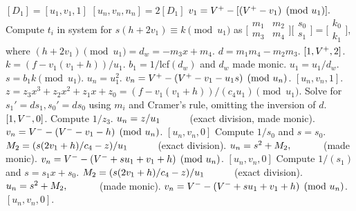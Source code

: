 \begin{algorithm}[htbp]
\caption{Genus 3 Split Model Degree 2 Doubling\label{alg:g3explSPLIT2DBL}}
\begin{algorithmic} [1]
\Require $[D_1]= [u_1, v_1,1]$ \smallskip
\Ensure $[u_n,v_n,n_n] = 2[D_1]$
\algrule
\State $v_1 = V^{+} - [(V^{+} - v_1) \pmod{u_1}].$
\State Compute $t_i$ in system for $s(h + 2v_1)\equiv k \pmod{u_1}$ as $ \bigl[
\begin{smallmatrix} m_1 & m_2\\ m_3 & m_4\end{smallmatrix}\bigr] \bigl[
\begin{smallmatrix} s_0\\ s_1 \end{smallmatrix} \bigr ] = \bigl[ \begin{smallmatrix}k_0
\\  k_1\end{smallmatrix} \bigr ]$, where $(h + 2v_1) \pmod{u_1} = d_w = -m_3x + m_4.$
\State $d = m_1m_4 - m_2m_3$.
     \hspace{1pt} \Return $[1,V^{+},2]$.
    \Else
        \State $k = (f - v_1(v_1 + h))/u_1$.
        \State $b_1 = 1/$lcf$(d_w)$ and $d_w$ made monic.
        \State $u_1 = u_1/d_w$.
        \State $s = b_1k \pmod{u_1}$.
        \State $u_n = u_1^2$.
        \State $v_n = V^{+} - (V^{+} - v_1 - u_1s) \pmod{u_n}$.
        \State \Return $[u_n,v_n,1]$.
    \EndIf
\EndIf
\State $z = z_3x^3 + z_2x^2 + z_1x + z_0 = (f - v_1(v_1 + h))/(c_4u_1) \pmod{u_1}.$
\State Solve for $s_1' = ds_1, s_0' = ds_0$ using $m_i$ and Cramer's rule, omitting the inversion of $d$.
         \Return $[1,V^{-},0]$.
        \Else
            \State Compute $1/z_3$.
            \State $u_n = z/u_1 \quad\quad\quad $(exact division, made monic).
            \State $v_n = V^{-} - (V^{-} - v_1 - h) \pmod{u_n}$.
            \State \Return $[u_n,v_n,0]$
        \EndIf
    \Else \hspace{4pt}
        \State Compute $1/s_0$ and $s= s_0$.
        \State $M_2 = (s(2v_1 + h)/c_4 - z)/u_1 \quad\quad\quad $(exact division).
        \State $u_n = s^2 + M_2, \quad\quad\quad $ (made monic).
        \State $v_n = V^{-} - (V^{-} + su_1 + v_1 + h) \pmod{u_n}$.
        \State \Return $[u_n,v_n,0]$
    \EndIf
\EndIf
\State Compute $1/(s_1)$ and $s = s_1x + s_0$.
\State $M_2 = (s(2v_1 + h)/c_4 - z)/u_1 \quad\quad\quad $(exact division).
\State $u_n = s^2 + M_2, \quad\quad\quad $ (made monic).
\State $v_n = V^{-} - (V^{-} + su_1 + v_1 + h) \pmod{u_n}$.
\State \Return $[u_n,v_n,0]$.
\end{algorithmic}
\end{algorithm}
